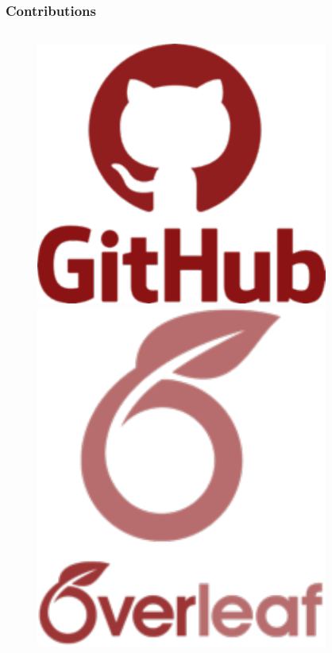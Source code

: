 \begin{frame}
 \frametitle{Contributions}
\begin{columns}
		\begin{column}{0.1\textwidth}

 					\begin{figure}
  						  \centering
   						 \includegraphics[width=0.9\textwidth]{../Tex/Contribute/ContribPictures/github.pdf}\\
   						 	 \includegraphics[width=0.9\textwidth]{../Tex//Contribute/ContribPictures/overleaf.pdf}
				  \end{figure}
		\end{column}
		\begin{column}{0.9\textwidth}
							
		\end{column}
\end{columns}

 \end{frame}
 
 





